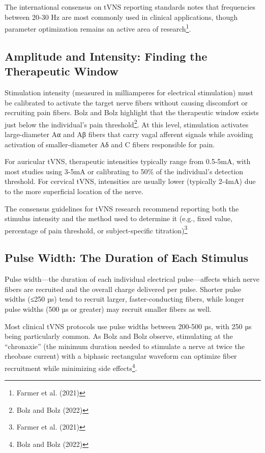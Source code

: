 \documentclass[
  Letterpaper,
]{scrbook}
\begin{document}
The international consensus on tVNS reporting standards notes that
frequencies between 20-30 Hz are most commonly used in clinical
applications, though parameter optimization remains an active area of
research\footnote{Farmer et al. (2021)}.

\subsection{Amplitude and Intensity: Finding the Therapeutic
Window}\label{amplitude-and-intensity-finding-the-therapeutic-window}

Stimulation intensity (measured in milliamperes for electrical
stimulation) must be calibrated to activate the target nerve fibers
without causing discomfort or recruiting pain fibers. Bolz and Bolz
highlight that the therapeutic window exists just below the individual's
pain threshold\footnote{Bolz and Bolz (2022)}. At this level,
stimulation activates large-diameter Aα and Aβ fibers that carry vagal
afferent signals while avoiding activation of smaller-diameter Aδ and C
fibers responsible for pain.

For auricular tVNS, therapeutic intensities typically range from
0.5-5mA, with most studies using 3-5mA or calibrating to 50\% of the
individual's detection threshold. For cervical tVNS, intensities are
usually lower (typically 2-4mA) due to the more superficial location of
the nerve.

The consensus guidelines for tVNS research recommend reporting both the
stimulus intensity and the method used to determine it (e.g., fixed
value, percentage of pain threshold, or subject-specific
titration)\footnote{Farmer et al. (2021)}

\subsection{Pulse Width: The Duration of Each
Stimulus}\label{pulse-width-the-duration-of-each-stimulus}

Pulse width---the duration of each individual electrical pulse---affects
which nerve fibers are recruited and the overall charge delivered per
pulse. Shorter pulse widths (≤250 µs) tend to recruit larger,
faster-conducting fibers, while longer pulse widths (500 µs or greater)
may recruit smaller fibers as well.

Most clinical tVNS protocols use pulse widths between 200-500 µs, with
250 µs being particularly common. As Bolz and Bolz observe, stimulating
at the ``chronaxie'' (the minimum duration needed to stimulate a nerve
at twice the rheobase current) with a biphasic rectangular waveform can
optimize fiber recruitment while minimizing side effects\footnote{Bolz
  and Bolz (2022)}.
\end{document}
